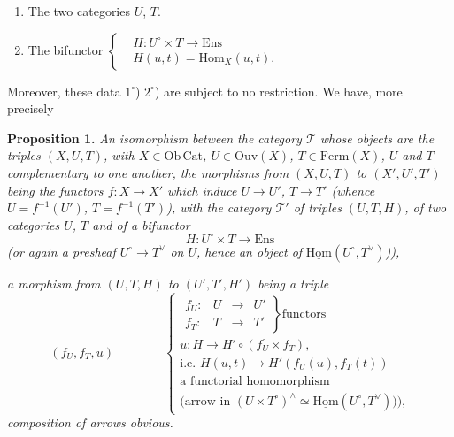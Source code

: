 \documentclass[11pt]{article}
\newcommand{\printedpage}[1]{\marginpar{\footnotesize p.~#1}}
\newcommand{\uHom}{\underline{\mathrm{Hom}}}
\begin{document}
\begin{enumerate}[label={}]
\item[$1^\circ$)] The two categories $U$, $T$.
\item[$2^\circ$)] The bifunctor $\displaystyle\left\{\begin{aligned}
&H : U^\circ \times T \longrightarrow \mathrm{Ens}\\[1ex]
&H(u,t) = \mathrm{Hom}_X(u,t).
\end{aligned}\right.$
\end{enumerate}

Moreover, these data $1^\circ$) $2^\circ$) are subject to no restriction. We have, more precisely %

\textbf{Proposition 1.} \textit{An isomorphism} \textit{between the category $\mathcal{T}$ whose objects are the triples $(X,U,T)$, with $X \in \mathrm{Ob}\,\mathrm{Cat}$, $U \in \mathrm{Ouv}(X)$, $T \in \mathrm{Ferm}(X)$, $U$ and $T$ complementary to one another, the morphisms from $(X,U,T)$ to $(X',U',T')$ being the functors $f : X \longrightarrow X'$ which induce $U \longrightarrow U'$, $T \longrightarrow T'$ (whence
\printedpage{44}
$U = f^{-1}(U')$, $T = f^{-1}(T')$), with the category $\mathcal{T}'$ of triples $(U,T,H)$, of two categories $U$, $T$ and of a bifunctor}
\[
H : U^\circ \times T \longrightarrow \mathrm{Ens}
\]
\hspace*{2em}\textit{(or again a presheaf $U^\circ \longrightarrow T^\vee$ on $U$, hence an object of} $\uHom(U^\circ,T^\vee)$\textit{)),} %

\textit{a morphism from $(U,T,H)$ to $(U',T',H')$ being a triple}
\[
(f_U, f_T, u) \qquad\qquad
\left\{\begin{array}{l}
\left.\begin{array}{llll}
f_U : & U & \longrightarrow & U' \\[1ex]
f_T : & T & \longrightarrow & T'
\end{array}\right\}\text{functors}\\[2ex]
u : H \longrightarrow H' \circ (f_U^\circ \times f_T),\\
\text{i.e. } H(u,t) \longrightarrow H'(f_U(u), f_T(t))\\
\text{a functorial homomorphism}\\
\text{(arrow in } (U \times T^\circ)^\wedge \simeq \uHom(U^\circ,T^\vee)\text{)),}
\end{array}\right.
\]
\textit{composition of arrows obvious.}
\end{document}
